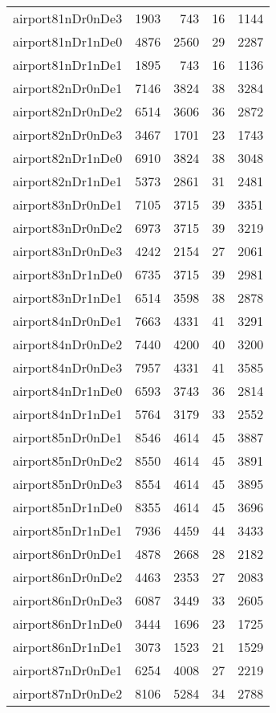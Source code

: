 \documentclass[../../../thesis.tex]{subfiles}
\begin{document}
\begin{longtable}{lrrrr}
airport81nDr0nDe3 & 1903 & 743 & 16 & 1144 \\
airport81nDr1nDe0 & 4876 & 2560 & 29 & 2287 \\
airport81nDr1nDe1 & 1895 & 743 & 16 & 1136 \\
airport82nDr0nDe1 & 7146 & 3824 & 38 & 3284 \\
airport82nDr0nDe2 & 6514 & 3606 & 36 & 2872 \\
airport82nDr0nDe3 & 3467 & 1701 & 23 & 1743 \\
airport82nDr1nDe0 & 6910 & 3824 & 38 & 3048 \\
airport82nDr1nDe1 & 5373 & 2861 & 31 & 2481 \\
airport83nDr0nDe1 & 7105 & 3715 & 39 & 3351 \\
airport83nDr0nDe2 & 6973 & 3715 & 39 & 3219 \\
airport83nDr0nDe3 & 4242 & 2154 & 27 & 2061 \\
airport83nDr1nDe0 & 6735 & 3715 & 39 & 2981 \\
airport83nDr1nDe1 & 6514 & 3598 & 38 & 2878 \\
airport84nDr0nDe1 & 7663 & 4331 & 41 & 3291 \\
airport84nDr0nDe2 & 7440 & 4200 & 40 & 3200 \\
airport84nDr0nDe3 & 7957 & 4331 & 41 & 3585 \\
airport84nDr1nDe0 & 6593 & 3743 & 36 & 2814 \\
airport84nDr1nDe1 & 5764 & 3179 & 33 & 2552 \\
airport85nDr0nDe1 & 8546 & 4614 & 45 & 3887 \\
airport85nDr0nDe2 & 8550 & 4614 & 45 & 3891 \\
airport85nDr0nDe3 & 8554 & 4614 & 45 & 3895 \\
airport85nDr1nDe0 & 8355 & 4614 & 45 & 3696 \\
airport85nDr1nDe1 & 7936 & 4459 & 44 & 3433 \\
airport86nDr0nDe1 & 4878 & 2668 & 28 & 2182 \\
airport86nDr0nDe2 & 4463 & 2353 & 27 & 2083 \\
airport86nDr0nDe3 & 6087 & 3449 & 33 & 2605 \\
airport86nDr1nDe0 & 3444 & 1696 & 23 & 1725 \\
airport86nDr1nDe1 & 3073 & 1523 & 21 & 1529 \\
airport87nDr0nDe1 & 6254 & 4008 & 27 & 2219 \\
airport87nDr0nDe2 & 8106 & 5284 & 34 & 2788 \\

\end{longtable}
\end{document}
